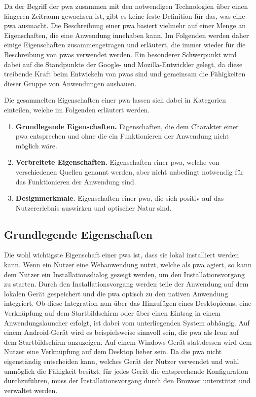 \documentclass[12pt, parskip=half]{scrartcl}       %
\newcommand\litem[1]{\item{\bfseries#1.\space}}
\begin{document}
Da der Begriff der \ac{pwa} zusammen mit den notwendigen Technologien über einen längeren Zeitraum gewachsen ist, gibt es keine feste Definition für das, was eine \ac{pwa} ausmacht.
Die Beschreibung einer \ac{pwa} basiert vielmehr auf einer Menge an Eigenschaften, die eine Anwendung innehaben kann.
Im Folgenden werden daher einige Eigenschaften zusammengetragen und erläutert, die immer wieder für die Beschreibung von \acp{pwa} verwendet werden.
Ein besonderer Schwerpunkt wird dabei auf die Standpunkte der Google- und Mozilla-Entwickler gelegt, da diese treibende Kraft beim Entwickeln von \acp{pwa} sind und gemeinsam die Fähigkeiten dieser Gruppe von Anwendungen ausbauen.

Die gesammelten Eigenschaften einer \ac{pwa} lassen sich dabei in Kategorien einteilen, welche im Folgenden erläutert werden.

\begin{enumerate}
  \litem{Grundlegende Eigenschaften} Eigenschaften, die dem Charakter einer \ac{pwa} entsprechen und ohne die ein Funktionieren der Anwendung nicht möglich wäre.

  \litem{Verbreitete Eigenschaften} Eigenschaften einer \ac{pwa}, welche von verschiedenen Quellen genannt werden, aber nicht unbedingt notwendig für das Funktionieren der Anwendung sind.

  \litem{Designmerkmale} Eigenschaften einer \ac{pwa}, die sich positiv auf das Nutzererlebnis auswirken und optischer Natur sind.
\end{enumerate}


\subsection{Grundlegende Eigenschaften}

Die wohl wichtigste Eigenschaft einer \ac{pwa} ist, dass sie lokal installiert werden kann.
Wenn ein Nutzer eine Webanwendung nutzt, welche als \ac{pwa} agiert, so kann dem Nutzer ein Installationsdialog gezeigt werden, um den Installationsvorgang zu starten.
Durch den Installationsvorgang werden teile der Anwendung auf dem lokalen Gerät gespeichert und die \ac{pwa} optisch zu den nativen Anwendung integriert.
Ob diese Integration nun über das Hinzufügen eines Desktopicons, eine Verknüpfung auf dem Startbildschirm oder über einen Eintrag in einem Anwendungslauncher erfolgt, ist dabei vom unterliegenden System abhängig.
Auf einem Android-Gerät wird es beispielsweise sinnvoll sein, die \ac{pwa} als Icon auf dem Startbildschirm anzuzeigen.
Auf einem Windows-Gerät stattdessen wird dem Nutzer eine Verknüpfung auf dem Desktop lieber sein.
Da die \ac{pwa} nicht eigenständig entscheiden kann, welches Gerät der Nutzer verwendet und wohl unmöglich die Fähigkeit besitzt, für jedes Gerät die entsprechende Konfiguration durchzuführen, muss der Installationsvorgang durch den Browser unterstützt und verwaltet werden.
\end{document}
